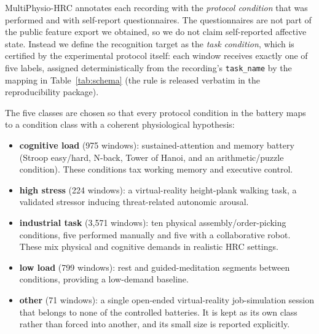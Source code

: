 \documentclass{llncs}
\begin{document}
MultiPhysio-\ac{HRC} annotates each recording with the \emph{protocol condition} that
was performed and with self-report questionnaires. The questionnaires are not part of
the public feature export we obtained, so we do not claim self-reported affective
state. Instead we define the recognition target as the \emph{task condition}, which
is certified by the experimental protocol itself: each window receives exactly one of
five labels, assigned deterministically from the recording's \texttt{task\_name} by
the mapping in Table~\ref{tab:schema} (the rule is released verbatim in the
reproducibility package).

The five classes are chosen so that every protocol condition in the battery maps to a
condition class with a coherent physiological hypothesis:

\begin{itemize}
\item \textbf{cognitive load} (975 windows): sustained-attention and memory battery
(Stroop easy/hard, N-back, Tower of Hanoi, and an arithmetic/puzzle condition). These
conditions tax working memory and executive control.
\item \textbf{high stress} (224 windows): a virtual-reality height-plank walking task,
a validated stressor inducing threat-related autonomic arousal.
\item \textbf{industrial task} (3,571 windows): ten physical assembly/order-picking
conditions, five performed manually and five with a collaborative robot. These mix
physical and cognitive demands in realistic \ac{HRC} settings.
\item \textbf{low load} (799 windows): rest and guided-meditation segments between
conditions, providing a low-demand baseline.
\item \textbf{other} (71 windows): a single open-ended virtual-reality job-simulation
session that belongs to none of the controlled batteries. It is kept as its own class
rather than forced into another, and its small size is reported explicitly.
\end{itemize}
\end{document}
